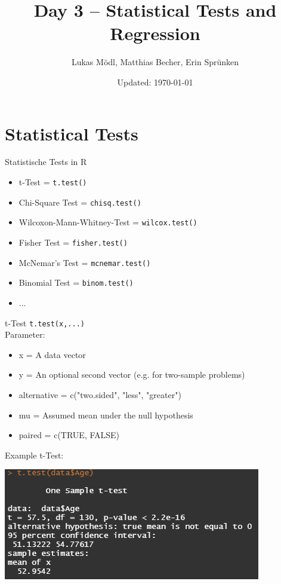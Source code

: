 \documentclass[aspectratio = 169]{chariteBeamer}
\author[L. Mödl, M. Becher, E. Sprünken]{Lukas Mödl, Matthias Becher, Erin Sprünken}
\title{Day 3 -- Statistical Tests and Regression}
\date[]{Updated: \today}
\begin{document}
\begin{frame}[plain]
    \titlepage%
\end{frame}
\frame{\tableofcontents}


\section{Statistical Tests}

\begin{frame}[fragile]{Statistische Tests in R}
	\begin{itemize}
		\item t-Test = \verb+t.test()+
		\item Chi-Square Test = \verb+chisq.test()+
		\item Wilcoxon-Mann-Whitney-Test = \verb+wilcox.test()+
		\item Fisher Test = \verb+fisher.test()+
		\item McNemar's Test = \verb+mcnemar.test()+
		\item Binomial Test = \verb+binom.test()+
		\item ...
	\end{itemize}
\end{frame}


\begin{frame}[fragile]{t-Test}
\verb+t.test(x,...)+\\
Parameter:
	\begin{itemize}
		\item x = A data vector
		\item y = An optional second vector (e.g. for two-sample problems)
		\item alternative = c("two.sided", "less", "greater")
		\item mu = Assumed mean under the null hypothesis
		\item paired = c(TRUE, FALSE)
	\end{itemize}
\end{frame}

\begin{frame}[fragile]{Example t-Test:}	
	\begin{center}
		\includegraphics{OneSampleTtest}
	\end{center}
\end{frame}
\end{document}
